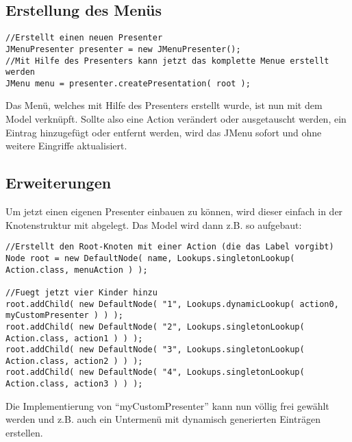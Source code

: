 \documentclass[oneside,a4paper]{scrartcl}
\begin{document}
\subsection{Erstellung des Menüs}

\begin{lstlisting}[breaklines=true]
//Erstellt einen neuen Presenter
JMenuPresenter presenter = new JMenuPresenter();
//Mit Hilfe des Presenters kann jetzt das komplette Menue erstellt werden
JMenu menu = presenter.createPresentation( root );
\end{lstlisting}

Das Menü, welches mit Hilfe des Presenters erstellt wurde, ist nun mit dem Model verknüpft. Sollte also eine
Action verändert oder ausgetauscht werden, ein Eintrag hinzugefügt oder entfernt werden, wird das JMenu
sofort und ohne weitere Eingriffe aktualisiert.


\subsection{Erweiterungen}
Um jetzt einen eigenen Presenter einbauen zu können, wird dieser einfach in der Knotenstruktur mit abgelegt. Das
Model wird dann z.B. so aufgebaut:

\begin{lstlisting}[breaklines=true]
//Erstellt den Root-Knoten mit einer Action (die das Label vorgibt)
Node root = new DefaultNode( name, Lookups.singletonLookup( Action.class, menuAction ) );

//Fuegt jetzt vier Kinder hinzu
root.addChild( new DefaultNode( "1", Lookups.dynamicLookup( action0, myCustomPresenter ) ) );
root.addChild( new DefaultNode( "2", Lookups.singletonLookup( Action.class, action1 ) ) );
root.addChild( new DefaultNode( "3", Lookups.singletonLookup( Action.class, action2 ) ) );
root.addChild( new DefaultNode( "4", Lookups.singletonLookup( Action.class, action3 ) ) );
\end{lstlisting}

Die Implementierung von \enquote{myCustomPresenter} kann nun völlig frei gewählt werden und z.B. auch ein Untermenü mit
dynamisch generierten Einträgen erstellen.
\end{document}
